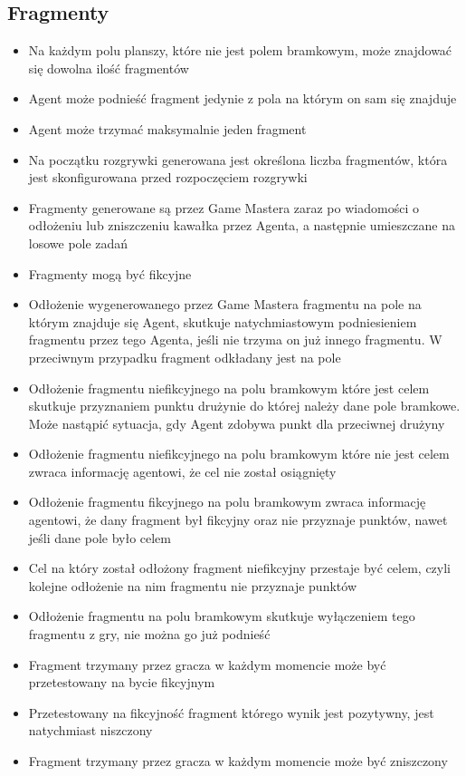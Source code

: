 \documentclass[Dokumentacja.tex]{subfiles}
\begin{document}
\subsection{Fragmenty}
\begin{itemize}
    \item Na każdym polu planszy, które nie jest polem bramkowym, może znajdować się dowolna ilość fragmentów
	\item Agent może podnieść fragment jedynie z pola na którym on sam się znajduje
    \item Agent może trzymać maksymalnie jeden fragment
    \item Na początku rozgrywki generowana jest określona liczba fragmentów, która jest skonfigurowana przed rozpoczęciem rozgrywki
    \item Fragmenty generowane są przez Game Mastera zaraz po wiadomości o odłożeniu lub zniszczeniu kawałka przez Agenta, a następnie umieszczane na losowe pole zadań
	\item Fragmenty mogą być fikcyjne
    \item Odłożenie wygenerowanego przez Game Mastera fragmentu na pole na którym znajduje się Agent, skutkuje natychmiastowym podniesieniem fragmentu przez tego Agenta, jeśli nie trzyma on już innego fragmentu. W przeciwnym przypadku fragment odkładany jest na pole
    \item Odłożenie fragmentu niefikcyjnego na polu bramkowym które jest celem skutkuje przyznaniem punktu drużynie do której należy dane pole bramkowe. Może nastąpić sytuacja, gdy Agent zdobywa punkt dla przeciwnej drużyny
    \item Odłożenie fragmentu niefikcyjnego na polu bramkowym które nie jest celem zwraca informację agentowi, że cel nie został osiągnięty
	\item Odłożenie fragmentu fikcyjnego na polu bramkowym zwraca informację agentowi, że dany fragment był fikcyjny oraz nie przyznaje punktów, nawet jeśli dane pole było celem
    \item Cel na który został odłożony fragment niefikcyjny przestaje być celem, czyli kolejne odłożenie na nim fragmentu nie przyznaje punktów
    \item Odłożenie fragmentu na polu bramkowym skutkuje wyłączeniem tego fragmentu z gry, nie można go już podnieść
    \item Fragment trzymany przez gracza w każdym momencie może być przetestowany na bycie fikcyjnym
    \item Przetestowany na fikcyjność fragment którego wynik jest pozytywny, jest natychmiast niszczony
    \item Fragment trzymany przez gracza w każdym momencie może być zniszczony
\end{itemize}
\end{document}
